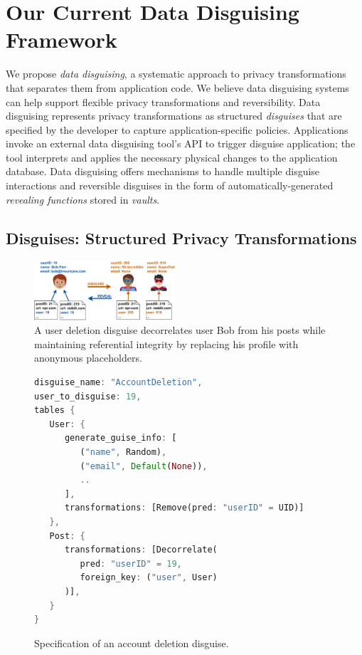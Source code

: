 \section{Our Current Data Disguising Framework}

We propose \emph{data disguising}, a systematic approach to privacy transformations that separates
them from application code. We believe data disguising systems can help support flexible privacy
transformations and reversibility.
%
Data disguising represents privacy transformations as structured \emph{disguises} that are specified
by the developer to capture application-specific policies.
%
Applications invoke an external data disguising tool's API to trigger disguise application; the tool
interprets and applies the necessary physical changes to the application database.
%
Data disguising offers mechanisms to handle multiple disguise interactions and reversible disguises
in the form of automatically-generated \emph{revealing functions} stored in \emph{vaults}.

%
%

\subsection{Disguises: Structured Privacy Transformations}
\label{sec:disguises}

\begin{figure}[t]
    \centering
    \includegraphics[width=0.47\textwidth]{img/disguises_new}

    \caption{A user deletion disguise decorrelates user Bob from his posts while maintaining
    referential integrity by replacing his profile with anonymous placeholders.}
    \label{fig:example}
\end{figure}

\begin{figure}[t!]
    \centering
    \footnotesize
\begin{lstlisting}[language=Rust]
disguise_name: "AccountDeletion",
user_to_disguise: 19,
tables {
   User: {
      generate_guise_info: [
         ("name", Random),
         ("email", Default(None)),
         ..
      ],
      transformations: [Remove(pred: "userID" = UID)]
   },
   Post: {
      transformations: [Decorrelate(
         pred: "userID" = 19,
         foreign_key: ("user", User)
      )],
   }
}
\end{lstlisting}
    \caption{Specification of an account deletion disguise.}
    \label{fig:spec}
\end{figure}

